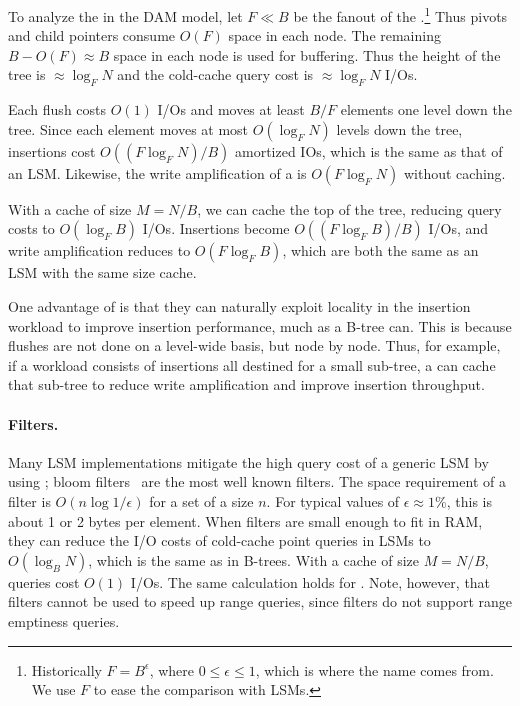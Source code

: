 To analyze the \bet in the DAM model, let $F\ll B$ be the fanout of
the \bet.\footnote{Historically $F = B^\epsilon$, where $0\leq
  \epsilon\leq 1$, which is where the name comes from.  We use $F$ to
  ease the comparison with LSMs.}  Thus pivots and child pointers
consume $O(F)$ space in each node.  The remaining $B-O(F)\approx B$
space in each node is used for buffering.  Thus the height of the tree
is $\approx\log_{F}N$ and the cold-cache query cost is
$\approx\log_F N$ I/Os.  

Each flush costs $O(1)$ I/Os and moves at least $B/F$ elements one
level down the tree.  Since each element moves at most $O(\log_F N)$
levels down the tree, insertions cost $O((F\log_F N)/B)$ amortized
IOs, which is the same as that of an LSM.  Likewise, the write
amplification of a \bet is $O(F\log_F N)$ without caching.

With a cache of size $M=N/B$, we can cache the top of the tree,
reducing query costs to $O(\log_F B)$ I/Os.  Insertions become
$O((F\log_F B)/B)$ I/Os, and write amplification reduces to
$O(F\log_F B)$, which are both the same as an LSM with the same size cache.

One advantage of \bets is that they can naturally exploit locality in the
insertion workload to improve insertion performance, much as a B-tree can.
This is because flushes are not done on a level-wide basis, but node by node.
Thus, for example, if a workload consists of insertions all destined for a
small sub-tree, a \bet can cache that sub-tree to reduce write amplification
and improve insertion throughput.

\paragraph{Filters.} Many LSM implementations mitigate the high
query cost of a generic LSM by using ; bloom filters~\cite{DBLP:journals/cacm/Bloom70} are the most well
known filters.
  The space requirement of a filter is $O(n
\log 1/\epsilon)$ for a set of a size $n$.  For typical values of
$\epsilon\approx 1\%$, this is about 1 or 2 bytes per element.
When filters are small enough to fit in RAM, they can reduce the I/O costs
of cold-cache point queries in LSMs to $O(\log_B N)$,
which is the same as in B-trees.  With a cache of size $M=N/B$,
queries cost $O(1)$ I/Os.  The same calculation holds for \bets. Note, however, that filters cannot
be used to speed up range queries, since filters do not support range
emptiness queries.

